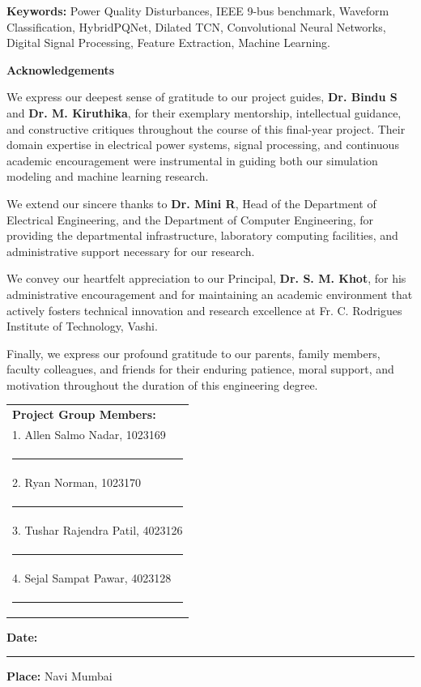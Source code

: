 \documentclass[12pt,a4paper]{report}
\begin{document}
\vspace{0.35cm}
\noindent\textbf{Keywords:} Power Quality Disturbances, IEEE 9-bus benchmark, Waveform Classification, HybridPQNet, Dilated TCN, Convolutional Neural Networks, Digital Signal Processing, Feature Extraction, Machine Learning.
\clearpage

\begin{center}
\vspace*{0.2cm}
{\LARGE\bf Acknowledgements}\\[0.6cm]
\end{center}

\justify
We express our deepest sense of gratitude to our project guides, \textbf{Dr. Bindu S} and \textbf{Dr. M. Kiruthika}, for their exemplary mentorship, intellectual guidance, and constructive critiques throughout the course of this final-year project. Their domain expertise in electrical power systems, signal processing, and continuous academic encouragement were instrumental in guiding both our simulation modeling and machine learning research.

We extend our sincere thanks to \textbf{Dr. Mini R}, Head of the Department of Electrical Engineering, and the Department of Computer Engineering, for providing the departmental infrastructure, laboratory computing facilities, and administrative support necessary for our research.

We convey our heartfelt appreciation to our Principal, \textbf{Dr. S. M. Khot}, for his administrative encouragement and for maintaining an academic environment that actively fosters technical innovation and research excellence at Fr. C. Rodrigues Institute of Technology, Vashi.

Finally, we express our profound gratitude to our parents, family members, faculty colleagues, and friends for their enduring patience, moral support, and motivation throughout the duration of this engineering degree.

\vspace{1.8cm}
\hfill
\begin{tabular}[t]{l@{}}
{\large\textbf{Project Group Members:}} \\[0.6cm]

1. Allen Salmo Nadar, 1023169 \\[0.15cm]
\noindent\rule{6cm}{0.4pt} \\[0.7cm]

2. Ryan Norman, 1023170 \\[0.15cm]
\noindent\rule{6cm}{0.4pt} \\[0.7cm]

3. Tushar Rajendra Patil, 4023126 \\[0.15cm]
\noindent\rule{6cm}{0.4pt} \\[0.7cm]

4. Sejal Sampat Pawar, 4023128 \\[0.15cm]
\noindent\rule{6cm}{0.4pt}
\end{tabular}

\vfill
\noindent
\textbf{Date:} \rule{3.5cm}{0.4pt} \hfill \textbf{Place:} Navi Mumbai
\clearpage
\end{document}
